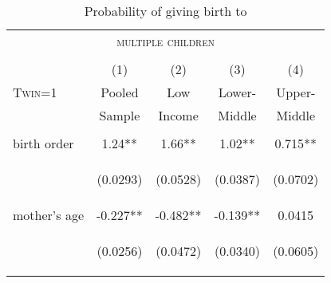 \documentclass{article}[11pt,subeqn]
\begin{document}
\begin{spacing}{1.5}
\begin{table}[htpb!]
\caption{Probability of giving birth to}
\vspace{-7mm}
\label{tab:twinreg1}
\begin{center}
\begin{tabular}{lcccc} 
\multicolumn{5}{c}{\textsc{multiple children}}\\
& & \\
\toprule
 & (1) & (2) & (3) & (4) \\
\textsc{Twin=1} & Pooled & Low & Lower- & Upper- \\ 
 & Sample & Income & Middle & Middle \\  \midrule
\vspace{4pt} & \begin{footnotesize}\end{footnotesize} & \begin{footnotesize}\end{footnotesize} & \begin{footnotesize}\end{footnotesize} & \begin{footnotesize}\end{footnotesize} \\
birth order & 1.24** &1.66** & 1.02** & 0.715** \\
\vspace{4pt} & \begin{footnotesize}(0.0293)\end{footnotesize} & \begin{footnotesize}(0.0528)\end{footnotesize} & \begin{footnotesize}(0.0387)\end{footnotesize} & \begin{footnotesize}(0.0702)\end{footnotesize} \\
mother's age & -0.227** & -0.482** & -0.139** & 0.0415 \\
\vspace{4pt} & \begin{footnotesize}(0.0256)\end{footnotesize} & \begin{footnotesize}(0.0472)\end{footnotesize} & \begin{footnotesize}(0.0340)\end{footnotesize} & \begin{footnotesize}(0.0605)\end{footnotesize} \\

\end{tabular}
\end{center}
\end{table}
\end{spacing}
\end{document}
